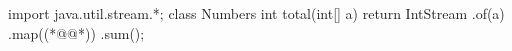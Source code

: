 
\begin{ffcode}
import
  java.util.stream.*;
class Numbers {
 int total(int[] a) {
  return IntStream
   .of(a)
   .map((*@@*))
   .sum();
 }
}
\end{ffcode}
